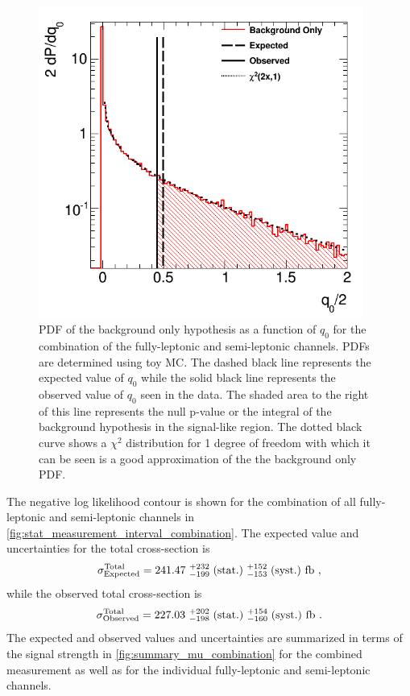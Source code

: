 \begin{figure}[ht!]
\centering
\includegraphics[width=0.95\textwidth]{figures/combination/significance.png}
\caption{PDF of the background only hypothesis as a function of $q_0$ for the combination of the fully-leptonic and semi-leptonic channels. PDFs are determined 
using toy MC. The dashed black line represents the expected value of $q_0$ while the solid black line represents the observed value of $q_0$ seen in the data. The shaded area to the right
of this line represents the null p-value or the 
integral of the background hypothesis in the signal-like region.
The dotted black curve shows a $\chi^2$ distribution for 1 degree of freedom with which 
it can be seen is a good approximation of the 
the background only PDF.}
\label{fig:stat_measurement_significance}
\end{figure}

The negative log likelihood contour is shown
for the combination of all fully-leptonic and semi-leptonic channels in 
\fig\ref{fig:stat_measurement_interval_combination}.
The expected value and uncertainties for the total cross-section is
\begin{equation}
\sigma^{\textrm{Total}}_{\textrm{Expected}} = 241.47 ~ ^{+232}_{-199} \mbox{$\;$(stat.)} ~^{+152}_{-153}\mbox{$\;$(syst.)} ~\textrm{fb} ~, 
\end{equation}
while the observed total cross-section is
\begin{equation}
\sigma^{\textrm{Total}}_{\textrm{Observed}} = 227.03 ~ ^{+202}_{-198} \mbox{$\;$(stat.)} ~^{+154}_{-160} \mbox{$\;$(syst.)} ~\textrm{fb} ~.
\end{equation}
The expected and observed values and uncertainties are summarized
in terms of the signal strength in \fig\ref{fig:summary_mu_combination}
for the combined measurement as well as for the individual
fully-leptonic and semi-leptonic channels.

